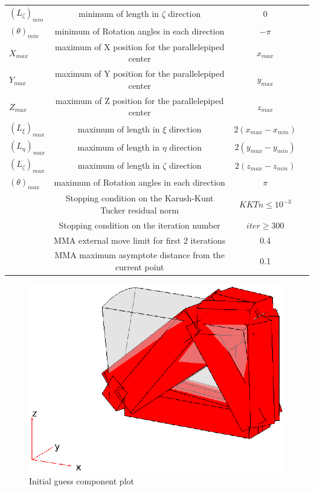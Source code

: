 \begin{table}[h]
\begin{tabular}{lccc}
    		$(L_\zeta)_{min}$ & minimum of length in $\zeta$ direction & $0$\\
    		$(\theta)_{min}$ & minimum of Rotation angles in each direction & $-\pi$\\
    		$X_{max}$ & maximum of X position for the parallelepiped center & $x_{max}$\\
    		$Y_{max}$ & maximum of Y position for the parallelepiped center & $y_{max}$\\
    		$Z_{max}$ & maximum of Z position for the parallelepiped center & $z_{max}$\\
    		$(L_\xi)_{max}$ & maximum of length in $\xi$ direction & $2(x_{max}-x_{min})$\\
    		$(L_\eta)_{max}$ & maximum of length in $\eta$ direction & $2(y_{max}-y_{min})$\\
    		$(L_\zeta)_{max}$ & maximum of length in $\zeta$ direction & $2(z_{max}-z_{min})$\\
    		$(\theta)_{max}$ & maximum of Rotation angles in each direction & $\pi$\\
    		 & Stopping condition on the Karush-Kunt Tucker residual norm & $KKTn\leq10^{-3}$\\ 
    		& Stopping condition on the iteration number & $iter \geq 300$ \\
    		& MMA external move limit for first 2 iterations & 0.4 \\
    		& MMA maximum asymptote distance from the current point & 0.1 \\
             \hline
             \end{tabular}
             \end{table}
  \begin{figure}[ht]
      \centering
      \includegraphics[width=\textwidth]{images/Ch3/Initial_guess_MNA_3D}
      \caption{Initial guess component plot}
      \label{fig.3.35}
      \end{figure}
